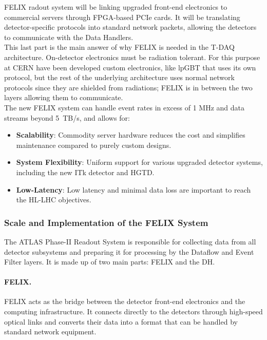 \acs{FELIX} radout system will be linking upgraded front-end electronics to commercial servers through \acs{FPGA}-based \acs{PCIe} cards. It will be translating detector-specific protocols into standard network packets, allowing the detectors to communicate with the Data Handlers.\\
This last part is the main answer of why \acs{FELIX} is needed in the \acs{T-DAQ} architecture. On-detector electronics must be radiation tolerant. For this purpose at \acs{CERN} have been developed custom electronics, like \acl{lpGBT} \cite{lpgbt} that uses its own protocol, but the rest of the underlying architecture uses normal network protocols since they are shielded from radiations; \acs{FELIX} is in between the two layers allowing them to communicate.\\
The new \acs{FELIX} system can handle event rates in excess of 1 MHz and data streams beyond 5~TB/s, and allows for:
\begin{itemize}
    \item \textbf{Scalability}: Commodity server hardware reduces the cost and simplifies maintenance compared to purely custom designs.
    \item \textbf{System Flexibility}: Uniform support for various upgraded detector systems, including the new \acs{ITk} detector and \acs{HGTD}.
    \item \textbf{Low-Latency}: Low latency and minimal data loss are important to reach the \acs{HL-LHC} objectives.
\end{itemize}

\subsubsection{Scale and Implementation of the \acs{FELIX} System}

The \acs{ATLAS} Phase-II Readout System is responsible for collecting data from all detector subsystems and preparing it for processing by the Dataflow and Event Filter layers. It is made up of two main parts: \acs{FELIX} and the \acf{DH}.

\paragraph{FELIX.}
\acf{FELIX} acts as the bridge between the detector front-end electronics and the computing infrastructure. It connects directly to the detectors through high-speed optical links and converts their data into a format that can be handled by standard network equipment.

